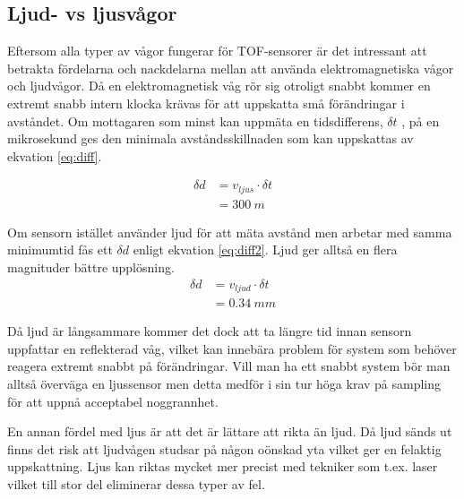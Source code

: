 \documentclass[a4paper,12pt,fleqn]{article}
\begin{document}
\subsection{Ljud- vs ljusvågor}
Eftersom alla typer av vågor fungerar för TOF-sensorer är det intressant att betrakta fördelarna och nackdelarna mellan att använda elektromagnetiska vågor och ljudvågor.
Då en elektromagnetisk våg rör sig otroligt snabbt kommer en extremt snabb intern klocka krävas för att uppskatta små förändringar i avståndet. Om mottagaren som minst kan uppmäta en tidsdifferens, \begin{math}\delta t\end{math} , på en mikrosekund ges den minimala avståndsskillnaden som kan uppskattas av ekvation \ref{eq:diff}.

\begin{equation}
\label{eq:diff}
\begin{split}
\delta d & = v_{ljus}\cdot\delta t \\
& = 300\:m
\end{split}
\end{equation}

Om sensorn istället använder ljud för att mäta avstånd men arbetar med samma minimumtid fås ett \begin{math}\delta d\end{math} enligt ekvation \ref{eq:diff2}.
Ljud ger alltså en flera magnituder bättre upplösning.
\begin{equation}
\label{eq:diff2}
\begin{split}
\delta d & = v_{ljud}\cdot\delta t \\
& = 0.34\:mm
\end{split}
\end{equation}

Då ljud är långsammare kommer det dock att ta längre tid innan sensorn uppfattar en reflekterad våg, vilket kan innebära problem för system som behöver reagera extremt snabbt på förändringar. Vill man ha ett snabbt system bör man alltså överväga en ljussensor men detta medför i sin tur höga krav på sampling för att uppnå acceptabel noggrannhet.

En annan fördel med ljus är att det är lättare att rikta än ljud. Då ljud sänds ut finns det risk att ljudvågen studsar på någon oönskad yta vilket ger en felaktig uppskattning.
Ljus kan riktas mycket mer precist med tekniker som t.ex. laser vilket till stor del eliminerar dessa typer av fel.
\end{document}
